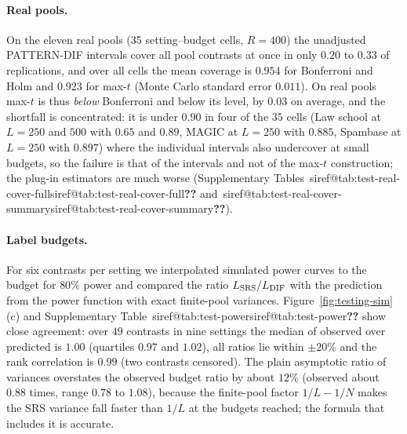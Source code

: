 \documentclass[pdflatex,sn-mathphys-num,iicol]{sn-jnl}
\makeatletter
\theoremstyle{thmstyleone}
\theoremstyle{thmstyletwo}
\theoremstyle{thmstylethree}
\newcommand{\SIref}[1]{\ifcsname siref@#1\endcsname\csname siref@#1\endcsname\else\textbf{??}\fi}
\makeatother
\begin{document}
\paragraph{Real pools.} On the eleven real pools (35 setting--budget cells, $R=400$) the unadjusted PATTERN-DIF intervals cover all pool contrasts at once in only $0.20$ to $0.33$ of replications, and over all cells the mean coverage is $0.954$ for Bonferroni and Holm and $0.923$ for max-$t$ (Monte Carlo standard error $0.011$). On real pools max-$t$ is thus \emph{below} Bonferroni and below its level, by $0.03$ on average, and the shortfall is concentrated: it is under $0.90$ in four of the $35$ cells (Law school at $L=250$ and $500$ with $0.65$ and $0.89$, MAGIC at $L=250$ with $0.885$, Spambase at $L=250$ with $0.897$) where the individual intervals also undercover at small budgets, so the failure is that of the intervals and not of the max-$t$ construction; the plug-in estimators are much worse (Supplementary Tables~\SIref{tab:test-real-cover-full} and~\SIref{tab:test-real-cover-summary}).

\paragraph{Label budgets.} For six contrasts per setting we interpolated simulated power curves to the budget for $80\%$ power and compared the ratio $L_{\rm SRS}/L_{\rm DIF}$ with the prediction from the power function with exact finite-pool variances. Figure~\ref{fig:testing-sim}(c) and Supplementary Table~\SIref{tab:test-power} show close agreement: over $49$ contrasts in nine settings the median of observed over predicted is $1.00$ (quartiles $0.97$ and $1.02$), all ratios lie within $\pm20\%$ and the rank correlation is $0.99$ (two contrasts censored). The plain asymptotic ratio of variances overstates the observed budget ratio by about $12\%$ (observed about $0.88$ times, range $0.78$ to $1.08$), because the finite-pool factor $1/L-1/N$ makes the SRS variance fall faster than $1/L$ at the budgets reached; the formula that includes it is accurate.
\end{document}
